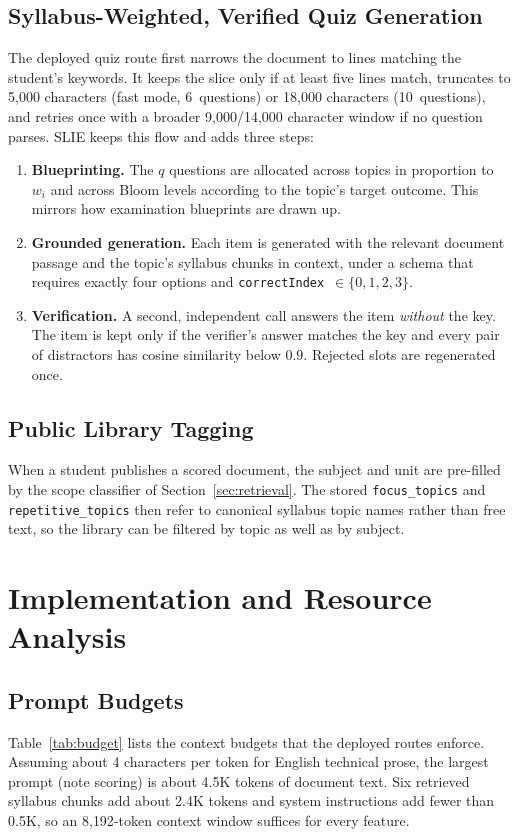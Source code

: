 \documentclass[conference]{IEEEtran}
\begin{document}
\subsection{Syllabus-Weighted, Verified Quiz Generation}
The deployed quiz route first narrows the document to lines matching the
student's keywords. It keeps the slice only if at least five lines match,
truncates to 5{,}000 characters (fast mode, 6~questions) or 18{,}000
characters (10~questions), and retries once with a broader 9{,}000/14{,}000
character window if no question parses. SLIE keeps this flow and adds three
steps:
\begin{enumerate}
\item \textbf{Blueprinting.} The $q$ questions are allocated across topics in
proportion to $w_i$ and across Bloom levels according to the topic's target
outcome. This mirrors how examination blueprints are drawn up.
\item \textbf{Grounded generation.} Each item is generated with the relevant
document passage and the topic's syllabus chunks in context, under a schema
that requires exactly four options and \texttt{correctIndex}~$\in\{0,1,2,3\}$.
\item \textbf{Verification.} A second, independent call answers the item
\emph{without} the key. The item is kept only if the verifier's answer
matches the key and every pair of distractors has cosine similarity below
$0.9$. Rejected slots are regenerated once.
\end{enumerate}

\subsection{Public Library Tagging}
When a student publishes a scored document, the subject and unit are
pre-filled by the scope classifier of Section~\ref{sec:retrieval}. The stored
\texttt{focus\_topics} and \texttt{repetitive\_topics} then refer to
canonical syllabus topic names rather than free text, so the library can be
filtered by topic as well as by subject.

\section{Implementation and Resource Analysis}
\label{sec:impl}

\subsection{Prompt Budgets}
Table~\ref{tab:budget} lists the context budgets that the deployed routes
enforce. Assuming about 4 characters per token for English technical prose,
the largest prompt (note scoring) is about 4.5K tokens of document text. Six
retrieved syllabus chunks add about 2.4K tokens and system instructions add
fewer than 0.5K, so an 8{,}192-token context window suffices for every
feature.
\end{document}
